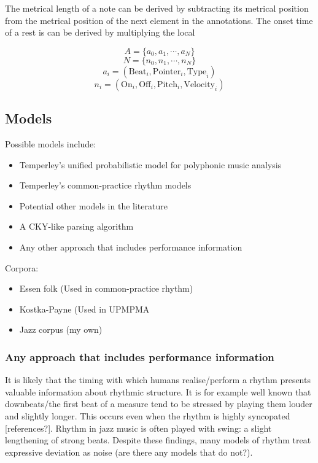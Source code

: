 \documentclass[a4paper,10pt]{article}
\begin{document}
The metrical length of a note can be derived by subtracting its metrical position from the metrical position of the next element in the annotations. The onset time of a rest is can be derived by multiplying the local 

\[A = \{a_0, a_1, \cdots, a_N\}\]
\[N = \{n_0, n_1, \cdots, n_N\}\]
\[a_i = (\mathrm{Beat}_i, \mathrm{Pointer}_i, \mathrm{Type}_i)\]
\[n_i = (\mathrm{On}_i, \mathrm{Off}_i, \mathrm{Pitch}_i, \mathrm{Velocity}_i)\]

\subsection{Models}

Possible models include:
\begin{itemize}
\item Temperley's unified probabilistic model for polyphonic music analysis
\item Temperley's common-practice rhythm models
\item Potential other models in the literature
\item A CKY-like parsing algorithm 
\item Any other approach that includes performance information
\end{itemize}

Corpora:
\begin{itemize}
\item Essen folk (Used in common-practice rhythm)
\item Kostka-Payne (Used in UPMPMA
\item Jazz corpus (my own)
\end{itemize}

\subsubsection*{Any approach that includes performance information}


It is likely that the timing with which humans realise/perform a rhythm presents valuable information about rhythmic structure. It is for example well known that downbeats/the first beat of a measure tend to be stressed by playing them louder and slightly longer. This occurs even when the rhythm is highly syncopated [references?]. Rhythm in jazz music is often played with swing: a slight lengthening of strong beats. Despite these findings, many models of rhythm treat expressive deviation as noise (are there any models that do not?). 
\end{document}
